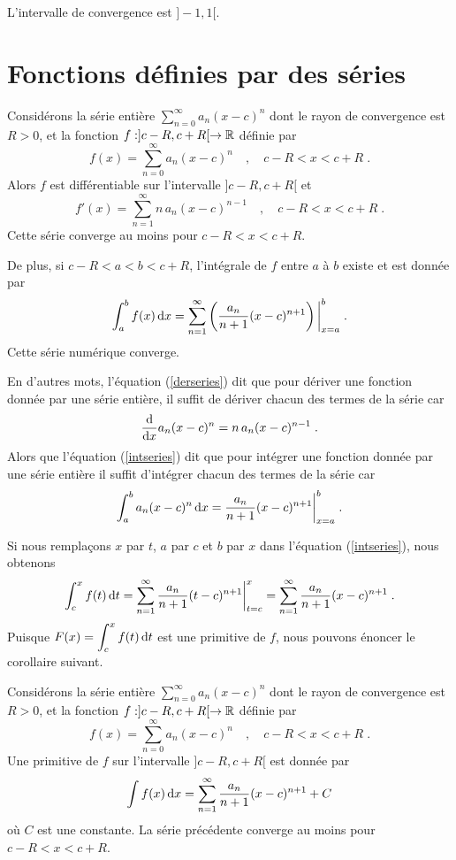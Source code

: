 {\begin{egg}
L'intervalle de convergence est $]-1,1[$.
\end{egg}

\section{Fonctions définies par des séries}

\begin{theorem} \label{der_int_series}
Considérons la série entière $\displaystyle \sum_{n=0}^\infty a_n (x-c)^n$
dont le rayon de convergence est $R>0$, et la fonction
$f:]c-R,c+R[\rightarrow \RR$ définie par
\[
f(x) = \sum_{n=0}^\infty a_n (x-c)^n \quad , \quad c-R<x<c+R \; .
\]
Alors $f$ est différentiable sur l'intervalle $]c-R,c+R[$ et
\begin{equation}\label{derseries}
f'(x) = \sum_{n=1}^\infty n\,a_n (x-c)^{n-1} \quad , \quad c-R<x<c+R \; .
\end{equation}
Cette série converge au moins pour $c-R<x<c+R$.

De plus, si $c-R<a<b<c+R$, l'intégrale de $f$ entre $a$
à $b$ existe et est donnée par
\begin{equation}\label{intseries}
\int_a^b f(x) \dx{x} =
\sum_{n=1}^\infty \left(\frac{a_n}{n+1} (x-c)^{n+1}\right) \bigg|_{x=a}^b \; .
\end{equation}
Cette série numérique converge.
\end{theorem}

\begin{rmk}
En d'autres mots, l'équation (\ref{derseries}) dit que pour dériver une
fonction donnée par une série entière, il suffit de dériver chacun des termes
de la série car
\[
\dfdx{a_n (x-c)^n}{x} = n\, a_n (x-c)^{n-1} \; .
\]
Alors que l'équation (\ref{intseries}) dit que pour intégrer
une fonction donnée par une série entière il suffit d'intégrer chacun des
termes de la série car
\[
\int_a^b a_n (x-c)^n \dx{x} 
= \frac{a_n}{n+1} (x-c)^{n+1} \bigg|_{x=a}^b \; .
\]
\end{rmk}

Si nous remplaçons $x$ par $t$, $a$ par $c$ et $b$ par $x$ dans l'équation
(\ref{intseries}), nous obtenons
\[
\int_c^x f(t) \dx{t} =
\sum_{n=1}^\infty \frac{a_n}{n+1} (t-c)^{n+1} \bigg|_{t=c}^x
= \sum_{n=1}^\infty \frac{a_n}{n+1} (x-c)^{n+1} \;.
\]
Puisque $\displaystyle F(x) = \int_c^x f(t) \dx{t}$ est une primitive
de $f$, nous pouvons énoncer le corollaire suivant.

\begin{cor}
Considérons la série entière $\displaystyle \sum_{n=0}^\infty a_n (x-c)^n$
dont le rayon de convergence est $R>0$, et la fonction
$f:]c-R,c+R[\rightarrow \RR$ définie par
\[
f(x) = \sum_{n=0}^\infty a_n (x-c)^n \quad , \quad c-R<x<c+R \; .
\]
Une primitive de $f$ sur l'intervalle $]c-R,c+R[$ est donnée
par
\[
\int f(x) \dx{x} = \sum_{n=1}^\infty \frac{a_n}{n+1} (x-c)^{n+1} +C
\]
où $C$ est une constante.  La série précédente converge au moins pour
$c-R<x<c+R$.
\end{cor}

}

